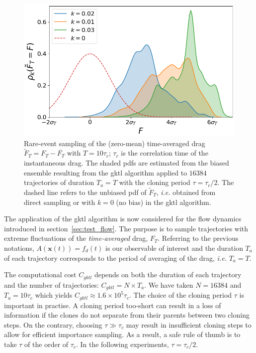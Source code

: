 \documentclass[pre,aps,floatfix,10pt,superscriptaddress, notitlepage,preprint]{revtex4-1}
\begin{document}
\begin{figure}
	\centering
	\includegraphics[width=0.7\linewidth]{IS_GKTL/IS_GKTL}
	\caption{\label{fig:IS_GKTL} Rare-event sampling of the (zero-mean) time-averaged drag $\tilde F_T = F_T - \overline{F_T}$ with $T=10\tau_c$; $\tau_c$ is the correlation time of the instantaneous drag. The shaded \ac{pdf}s are estimated from the biased ensemble resulting from the \ac{gktl} algorithm applied to $16384$ trajectories of duration $T_a=T$ with the cloning period $\tau=\tau_c/2$.
	The dashed line refers to the unbiased \ac{pdf} of $\tilde F_T$, \textit{i.e.} obtained from direct sampling or with $k=0$ (no bias) in the \ac{gktl} algorithm.
}
\end{figure}

The application of the \ac{gktl} algorithm is now considered for the flow dynamics introduced in section~\ref{sec:test_flow}. The purpose is to sample trajectories with extreme fluctuations of the \textit{time-averaged} drag, $F_T$. {Referring to the previous notations, $A(\mathbf{x}(t))=f_d(t)$ is our observable of interest and the duration $T_a$ of each trajectory corresponds to the period of averaging of the drag, \emph{i.e.} $T_a=T$.}    

The computational cost $C_{{gktl}}$ depends on both the duration of each trajectory and the number of trajectories: $C_{gktl} = N \times T_a$.
We have taken $N=16384$ and $T_a = 10\tau_c$ which yields $C_{gktl} \approx 1.6 \times 10^5 \tau_c$. The choice of the cloning period $\tau$ is important in practise.
A  cloning period too-short can result in a loss of information if the clones do not separate from their parents between two cloning steps. On the contrary, choosing $\tau \gg \tau_c$ may result in insufficient cloning steps to allow for efficient importance sampling.
As a result, a safe rule of thumb is to take $\tau$ of the order of $\tau_c$.
In the following experiments, $\tau = \tau_c /2$. 
%
\end{document}
